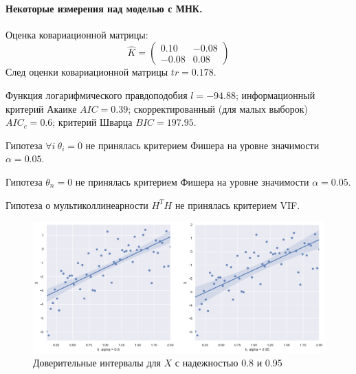 \documentclass[a4paper,12pt]{article}
\begin{document}
\paragraph{Некоторые измерения над моделью с МНК.\\}
Оценка ковариационной матрицы:
$$ \hat{K} = 
\begin{pmatrix}
    0.10 & -0.08\\
    -0.08 & 0.08
\end{pmatrix}
$$
След оценки ковариационной матрицы $tr = 0.178$.

Функция логарифмического правдоподобия $l = -94.88$; информационный критерий Акаике $AIC = 0.39$; скорректированный (для малых выборок) $AIC_c = 0.6$; критерий Шварца $BIC = 197.95$.

Гипотеза $\forall i~\theta_i=0$ не принялась критерием Фишера на уровне значимости $\alpha = 0.05$.

Гипотеза $\theta_n = 0$ не принялась критерием Фишера на уровне значимости $\alpha = 0.05$.

Гипотеза о мультиколлинеарности $H^T H$ не принялась критерием VIF.


\begin{figure}[H]
    \includegraphics[width=\linewidth]{src/img/доврительные_интервалы.png}
    \caption{Доверительные интервалы для $X$ с надежностью 0.8 и 0.95}
\end{figure}
\end{document}
